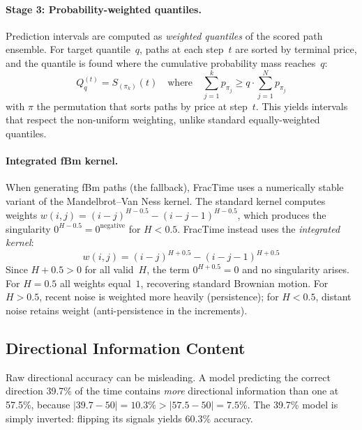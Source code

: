 \documentclass[12pt,a4paper]{article}
\begin{document}
\paragraph{Stage 3: Probability-weighted quantiles.}
Prediction intervals are computed as \emph{weighted quantiles} of the
scored path ensemble.  For target quantile~$q$, paths at each step~$t$
are sorted by terminal price, and the quantile is found where the
cumulative probability mass reaches~$q$:
\begin{equation}
  Q_q^{(t)} = S_{(\pi_k)}(t) \quad \text{where} \quad
    \sum_{j=1}^{k} p_{\pi_j} \geq q \cdot \sum_{j=1}^{N} p_{\pi_j}
  \label{eq:weighted_quantile}
\end{equation}
with $\pi$ the permutation that sorts paths by price at step~$t$.
This yields intervals that respect the non-uniform weighting, unlike
standard equally-weighted quantiles.

\paragraph{Integrated fBm kernel.}
When generating fBm paths (the fallback), FracTime uses a numerically
stable variant of the Mandelbrot--Van Ness kernel.  The standard kernel
computes weights $w(i,j) = (i-j)^{H-0.5} - (i-j-1)^{H-0.5}$, which
produces the singularity $0^{H-0.5} = 0^{\text{negative}}$ for $H < 0.5$.
FracTime instead uses the \emph{integrated kernel}:
\begin{equation}
  w(i,j) = (i-j)^{H+0.5} - (i-j-1)^{H+0.5}
  \label{eq:integrated_kernel}
\end{equation}
Since $H + 0.5 > 0$ for all valid~$H$, the term $0^{H+0.5} = 0$ and no
singularity arises.  For $H = 0.5$ all weights equal~$1$, recovering
standard Brownian motion.  For $H > 0.5$, recent noise is weighted
more heavily (persistence); for $H < 0.5$, distant noise retains weight
(anti-persistence in the increments).

\subsection{Directional Information Content}

Raw directional accuracy can be misleading.  A model predicting the correct
direction 39.7\% of the time contains \emph{more} directional information
than one at 57.5\%, because $|39.7 - 50| = 10.3\% > |57.5 - 50| = 7.5\%$.
The 39.7\% model is simply inverted: flipping its signals yields 60.3\%
accuracy.
\end{document}
